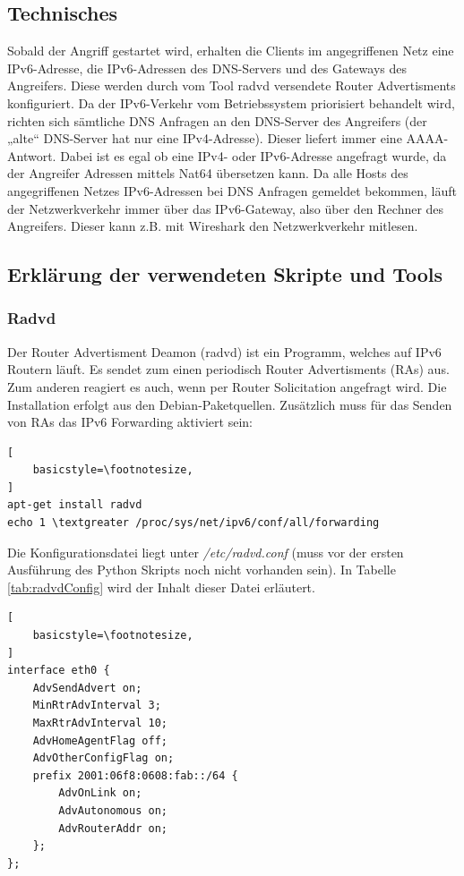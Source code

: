 \subsection*{Technisches}
Sobald der Angriff gestartet wird, erhalten die Clients im angegriffenen Netz eine IPv6-Adresse, die IPv6-Adressen des DNS-Servers und des Gateways des Angreifers. Diese werden durch vom Tool radvd versendete Router Advertisments konfiguriert. Da der IPv6-Verkehr vom Betriebssystem priorisiert behandelt wird, richten sich sämtliche DNS Anfragen an den DNS-Server des Angreifers (der „alte“ DNS-Server hat nur eine IPv4-Adresse). 
Dieser liefert immer eine AAAA-Antwort. Dabei ist es egal ob eine IPv4- oder IPv6-Adresse angefragt wurde, da der Angreifer Adressen mittels Nat64 übersetzen kann. Da alle Hosts des angegriffenen Netzes IPv6-Adressen bei DNS Anfragen gemeldet bekommen, läuft der Netzwerkverkehr immer über das IPv6-Gateway, also über den Rechner des Angreifers. Dieser kann z.B. mit Wireshark den Netzwerkverkehr mitlesen.

\subsection*{Erklärung der verwendeten Skripte und Tools}

\subsubsection*{Radvd}
Der Router Advertisment Deamon (radvd) ist ein Programm, welches auf IPv6 Routern läuft. Es sendet zum einen periodisch Router Advertisments (RAs) aus. Zum anderen reagiert es auch, wenn per Router Solicitation angefragt wird. Die Installation erfolgt aus den Debian-Paketquellen. Zusätzlich muss für das Senden von RAs das IPv6 Forwarding aktiviert sein:
\lstset{language=bash}
\begin{lstlisting}[
	basicstyle=\footnotesize,
]
apt-get install radvd
echo 1 \textgreater /proc/sys/net/ipv6/conf/all/forwarding
\end{lstlisting}

Die Konfigurationsdatei liegt unter \textit{/etc/radvd.conf} (muss vor der ersten Ausführung des Python Skripts noch nicht vorhanden sein). In Tabelle \ref{tab:radvdConfig} wird der Inhalt dieser Datei erläutert.
\begin{lstlisting}[
	basicstyle=\footnotesize,
]
interface eth0 {
	AdvSendAdvert on;
	MinRtrAdvInterval 3;
	MaxRtrAdvInterval 10;
	AdvHomeAgentFlag off;
	AdvOtherConfigFlag on;
	prefix 2001:06f8:0608:fab::/64 {
		AdvOnLink on;
		AdvAutonomous on;
		AdvRouterAddr on;
	};
};
\end{lstlisting}


